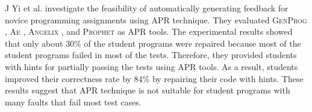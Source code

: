\documentclass[10pt,conference]{IEEEtran}
\begin{document}
        J Yi et al. \cite{yi2017feasibility} investigate the feasibility of automatically generating feedback for novice programming assignments using APR technique. They evaluated \textsc{GenProg} \cite{le2011genprog}, \textsc{Ae} \cite{weimer2013leveraging}, \textsc{Angelix} \cite{mechtaev2016angelix}, and \textsc{Prophet} \cite{long2016automatic} as APR tools. The experimental results showed that only about 30\% of the student programs were repaired because most of the student programs failed in most of the tests. Therefore, they provided students with hints for partially passing the tests using APR tools. As a result, students improved their correctness rate by 84\% by repairing their code with hints. These results suggest that APR technique is not suitable for student programs with many faults that fail most test cases.
        
        
\end{document}

